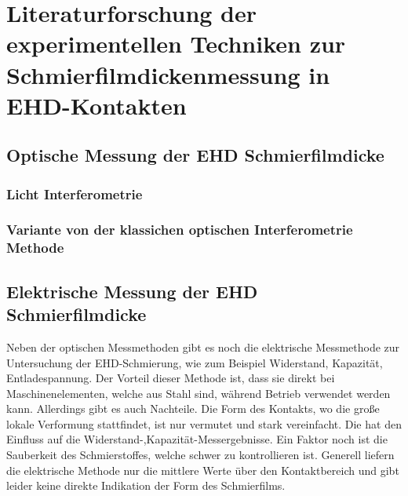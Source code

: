\chapter{Literaturforschung der experimentellen Techniken zur Schmierfilmdickenmessung in EHD-Kontakten}
\label{chap:literaturforschung_der_experimentellen_technik_in_ehd_schmierung}

\section{Optische Messung der EHD Schmierfilmdicke}
\label{sec:optische_messung_der_ehd_schmierfilmdicke}

\subsection{Licht Interferometrie}
\label{ssec:licht_interferometrie}

\subsection{Variante von der klassichen optischen Interferometrie Methode}
\label{ssec:variante_interferometrie}

\section{Elektrische Messung der EHD Schmierfilmdicke}
\label{sec:elektrische_messung_der_ehd_schmierfilmdicke}

Neben der optischen Messmethoden gibt es noch die elektrische Messmethode zur Untersuchung der EHD-Schmierung, wie zum Beispiel Widerstand, Kapazität, Entladespannung.
Der Vorteil dieser Methode ist, dass sie direkt bei Maschinenelementen, welche aus Stahl sind, während Betrieb verwendet werden kann.
Allerdings gibt es auch Nachteile.
Die Form des Kontakts, wo die große lokale Verformung stattfindet, ist nur vermutet und stark vereinfacht.
Die hat den Einfluss auf die Widerstand-,Kapazität-Messergebnisse.
Ein Faktor noch ist die Sauberkeit des Schmierstoffes, welche schwer zu kontrollieren ist.
Generell liefern die elektrische Methode nur die mittlere Werte über den Kontaktbereich und gibt leider keine direkte Indikation der Form des Schmierfilms.

